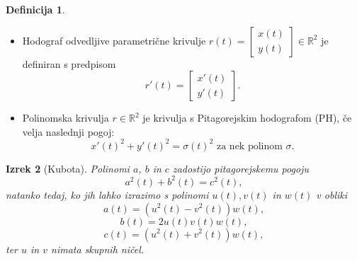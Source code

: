 \documentclass[12pt]{beamer}
\theoremstyle{definition} %
\newtheorem{definicija}{Definicija}[section]
\theoremstyle{plain} %
\newtheorem{izrek}[definicija]{Izrek}
\begin{document}
\begin{frame}
    
    \begin{definicija}
        \begin{itemize}
            \item Hodograf odvedljive parametrične krivulje $r (t) = \begin{bmatrix} x(t) \\ y(t) \end{bmatrix} \in \mathbb{R}^2$ je definiran s predpisom $$r'(t) = \begin{bmatrix} x'(t) \\ y'(t) \end{bmatrix}.$$
            \item  Polinomska krivulja $r \in \mathbb{R}^2$ je krivulja s Pitagorejskim hodografom (PH), če velja naslednji pogoj:
            $$x'(t)^2 + y'(t)^2 = \sigma(t)^2 \text{ za nek polinom } \sigma.$$
        \end{itemize} 
    \end{definicija}
\end{frame}

\begin{frame}
    \begin{izrek}[Kubota]
        Polinomi $a$, $b$ in $c$ zadostijo pitagorejskemu pogoju
        $$a^2(t) + b^2(t) = c^2(t),$$
        natanko tedaj, ko jih lahko izrazimo s polinomi $u(t), v(t)$ in $w(t)$ v obliki
        $$a(t) = (u^2(t) - v^2(t))w(t),$$
        $$b(t) = 2u(t)v(t)w(t),$$
        $$c(t) = (u^2(t) + v^2(t))w(t),$$
        ter $u$ in $v$ nimata skupnih ničel.
        
    \end{izrek}

\end{frame}
\end{document}
